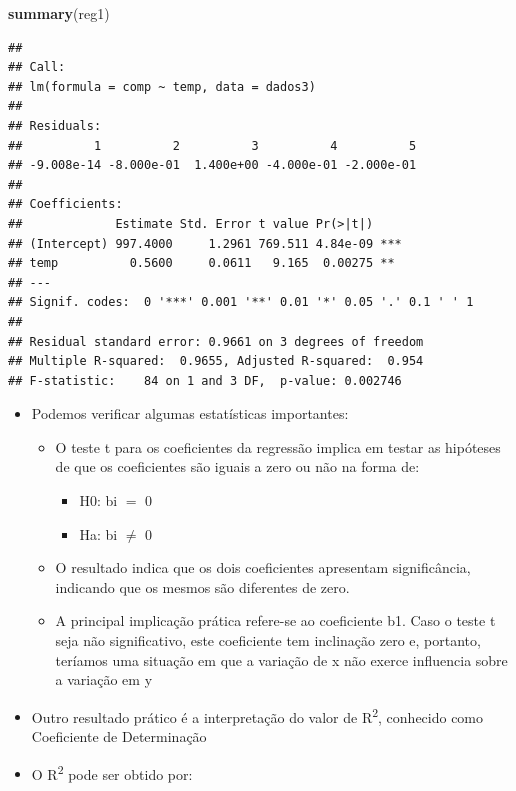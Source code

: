 \documentclass[
]{book}
\newenvironment{Shaded}{\begin{snugshade}}{\end{snugshade}}
\newcommand{\FunctionTok}[1]{\textcolor[rgb]{0.13,0.29,0.53}{\textbf{#1}}}
\newcommand{\NormalTok}[1]{#1}
\providecommand{\tightlist}{%
  \setlength{\itemsep}{0pt}\setlength{\parskip}{0pt}}
\begin{document}
\begin{Shaded}
\begin{Highlighting}[]
\FunctionTok{summary}\NormalTok{(reg1)}
\end{Highlighting}
\end{Shaded}

\begin{verbatim}
## 
## Call:
## lm(formula = comp ~ temp, data = dados3)
## 
## Residuals:
##          1          2          3          4          5 
## -9.008e-14 -8.000e-01  1.400e+00 -4.000e-01 -2.000e-01 
## 
## Coefficients:
##             Estimate Std. Error t value Pr(>|t|)    
## (Intercept) 997.4000     1.2961 769.511 4.84e-09 ***
## temp          0.5600     0.0611   9.165  0.00275 ** 
## ---
## Signif. codes:  0 '***' 0.001 '**' 0.01 '*' 0.05 '.' 0.1 ' ' 1
## 
## Residual standard error: 0.9661 on 3 degrees of freedom
## Multiple R-squared:  0.9655, Adjusted R-squared:  0.954 
## F-statistic:    84 on 1 and 3 DF,  p-value: 0.002746
\end{verbatim}

\begin{itemize}
\item
  Podemos verificar algumas estatísticas importantes:

  \begin{itemize}
  \item
    O teste t para os coeficientes da regressão implica em testar as hipóteses de que os coeficientes são iguais a zero ou não na forma de:

    \begin{itemize}
    \tightlist
    \item
      H0: bi \(=\) 0
    \item
      Ha: bi \(\neq\) 0
    \end{itemize}
  \item
    O resultado indica que os dois coeficientes apresentam significância, indicando que os mesmos são diferentes de zero.
  \item
    A principal implicação prática refere-se ao coeficiente b1. Caso o teste t seja não significativo, este coeficiente tem inclinação zero e, portanto, teríamos uma situação em que a variação de x não exerce influencia sobre a variação em y
  \end{itemize}
\item
  Outro resultado prático é a interpretação do valor de R\textsuperscript{2}, conhecido como Coeficiente de Determinação
\item
  O R\textsuperscript{2} pode ser obtido por:
\end{itemize}
\end{document}
